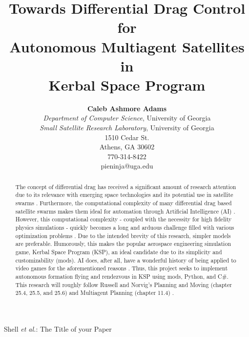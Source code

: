 \documentclass[journal,a4paper]{IEEEtran}
\begin{document}
%
\title{Towards Differential Drag Control for\\ Autonomous Multiagent Satellites in\\ Kerbal Space Program}

\author{
\textbf{Caleb Ashmore Adams}\\
\textit{Department of Computer Science}, University of Georgia\\
\textit{Small Satellite Research Laboratory}, University of Georgia\\
1510 Cedar St.\\
Athens, GA 30602\\
770-314-8422\\
pieninja@uga.edu
}


%
{Shell \MakeLowercase{\textit{et al.}}: The Title of your Paper}
%

\maketitle

\begin{abstract}
  The concept of differential drag has received a significant amount of research
  attention due to its relevance with emerging space technologies and its potential
  use in satellite swarms \cite{horsley}. Furthermore, the computational complexity
  of many differential drag based satellite swarms makes them ideal for automation
  through Artificial Intelligence (AI) \cite{swarm_ai}. However, this computational
  complexity - coupled with the necessity for high fidelity physics simulations -
  quickly becomes a long and arduous challenge filled with various optimization
  problems \cite{sin}. Due to the intended brevity of this research, simpler models
  are preferable. Humorously, this makes the popular aerospace engineering simulation
  game, Kerbal Space Program (KSP), an ideal candidate due to its simplicity and
  customizability (mods). AI does, after all, have a wonderful history of being
  applied to video games for the aforementioned reasons \cite{ai_games_book}\cite{wiki_ai_games}.
  Thus, this project seeks to implement autonomous formation flying and rendezvous
  in KSP using mods, Python, and C\#. This research will roughly follow
  Russell and Norvig’s Planning and Moving (chapter  25.4, 25.5, and 25.6) and Multiagent
  Planning (chapter 11.4) \cite{class_book}.

\end{abstract}
\end{document}
